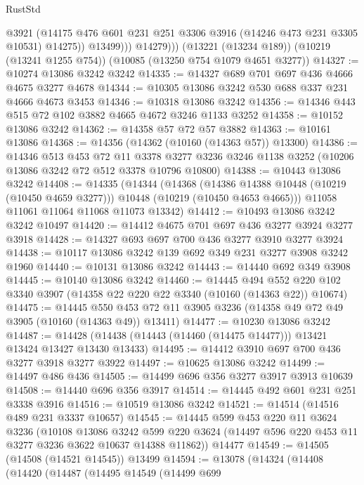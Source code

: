 \begin{lexlean}{RustStd}
\begin{coremodule}
                  @3921
                  (@14175 @476 @601 @231 @251 @3306 @3916 (@14246 @473 @231 @3305 @10531) @14275))
                @13499)))
          @14279)))
    (@13221 (@13234 @189))
    (@10219 (@13241 @1255 @754))
    (@10085 (@13250 @754 @1079 @4651 @3277))
@14327 := @10274 @13086 @3242 @3242
@14335 := @14327 @689 @701 @697 @436 @4666 @4675 @3277 @4678
@14344 := @10305 @13086 @3242 @530 @688 @337 @231 @4666 @4673 @3453
@14346 := @10318 @13086 @3242
@14356 := @14346 @443 @515 @72 @102 @3882 @4665 @4672 @3246 @1133 @3252
@14358 := @10152 @13086 @3242
@14362 := @14358 @57 @72 @57 @3882
@14363 := @10161 @13086
@14368 := @14356 (@14362 (@10160 (@14363 @57)) @13300)
@14386 := @14346
    @513
    @453
    @72
    @11
    @3378
    @3277
    @3236
    @3246
    @1138
    @3252
    (@10206 @13086 @3242 @72 @512 @3378 @10796 @10800)
@14388 := @10443 @13086 @3242
@14408 := @14335
    (@14344
      (@14368
        (@14386 @14388 @10448 (@10219 (@10450 @4659 @3277)))
        @10448
        (@10219 (@10450 @4653 @4665)))
      @11058
      @11061
      @11064
      @11068
      @11073
      @13342)
@14412 := @10493 @13086 @3242 @3242 @10497
@14420 := @14412 @4675 @701 @697 @436 @3277 @3924 @3277 @3918
@14428 := @14327 @693 @697 @700 @436 @3277 @3910 @3277 @3924
@14438 := @10117 @13086 @3242 @139 @692 @349 @231 @3277 @3908 @3242 @1960
@14440 := @10131 @13086 @3242
@14443 := @14440 @692 @349 @3908
@14445 := @10140 @13086 @3242
@14460 := @14445
    @494
    @552
    @220
    @102
    @3340
    @3907
    (@14358 @22 @220 @22 @3340 (@10160 (@14363 @22)) @10674)
@14475 := @14445
    @550
    @453
    @72
    @11
    @3905
    @3236
    (@14358 @49 @72 @49 @3905 (@10160 (@14363 @49)) @13411)
@14477 := @10230 @13086 @3242
@14487 := @14428 (@14438 (@14443 (@14460 (@14475 @14477))) @13421 @13424 @13427 @13430 @13433)
@14495 := @14412 @3910 @697 @700 @436 @3277 @3918 @3277 @3922
@14497 := @10625 @13086 @3242
@14499 := @14497 @486 @436
@14505 := @14499 @696 @356 @3277 @3917 @3913 @10639
@14508 := @14440 @696 @356 @3917
@14514 := @14445 @492 @601 @231 @251 @3338 @3916
@14516 := @10519 @13086 @3242
@14521 := @14514 (@14516 @489 @231 @3337 @10657)
@14545 := @14445
    @599
    @453
    @220
    @11
    @3624
    @3236
    (@10108
      @13086
      @3242
      @599
      @220
      @3624
      (@14497 @596 @220 @453 @11 @3277 @3236 @3622 @10637 @14388 @11862))
    @14477
@14549 := @14505 (@14508 (@14521 @14545)) @13499
@14594 := @13078
    (@14324
      (@14408
        (@14420
          (@14487
            (@14495
              @14549
              (@14499
                @699

\end{coremodule}
\end{lexlean}
